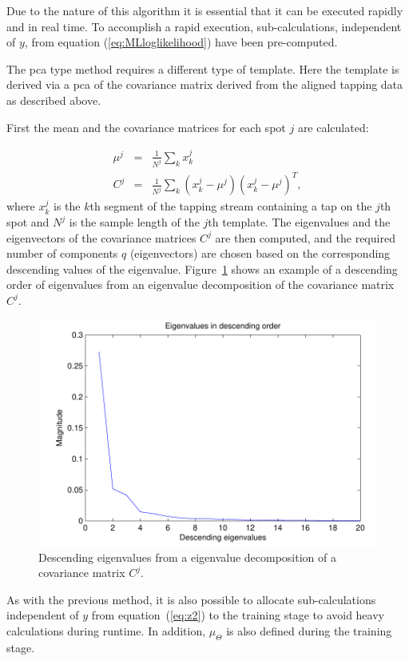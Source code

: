 Due to the nature of this algorithm it is essential that it can be executed rapidly and in real time. To accomplish a rapid execution, sub-calculations, independent of $y$, from equation (\ref{eq:MLloglikelihood}) have been pre-computed.

The \gls{pca} type method requires a different type of template. Here the template is derived via a \gls{pca} of the covariance matrix derived from the aligned tapping data as described above.

First the mean and the covariance matrices for each spot $j$ are calculated:

\begin{eqnarray}\nonumber
\mu^j &=& \frac{1}{N^j} \sum_k x^j_k \\\label{eq:PCAcovariance}
C^j &=& \frac{1}{N^j}\sum_k \left(x^j_k - \mu^j\right)\left(x^j_k - \mu^j\right)^T,
\end{eqnarray}
where $x^j_k$ is the $k$th segment of the tapping stream containing a tap on the $j$th spot and $N^j$ is the sample length of the $j$th template. The eigenvalues and the eigenvectors of the covariance matrices $C^j$ are then computed, and the required number of components $q$ (eigenvectors) are chosen based on the corresponding descending values of the eigenvalue. Figure~\ref{fig:eigenvalues} shows an example of a descending order of eigenvalues from an eigenvalue decomposition of the covariance matrix $C^j$.

\begin{figure}[!]
\centering
\includegraphics[width=120mm]{eigenvalues.pdf}
\caption{Descending eigenvalues from a eigenvalue decomposition of a covariance matrix $C^j$.}\label{fig:eigenvalues}
\end{figure}

As with the previous method, it is also possible to allocate sub-calculations independent of $y$ from equation~(\ref{eq:z2}) to the training stage to avoid heavy calculations during runtime. In addition, $\mu_\Theta$ is also defined during the training stage.

